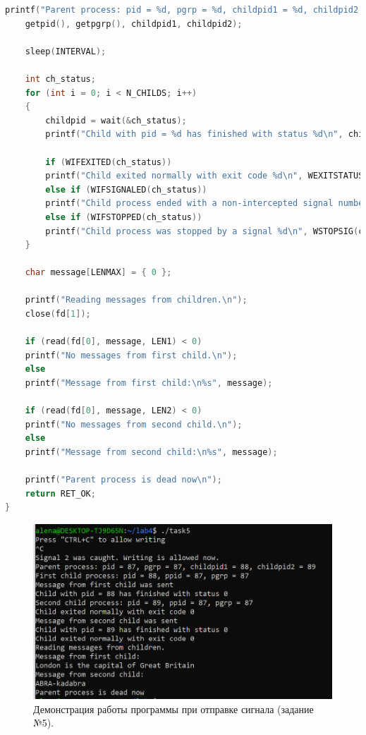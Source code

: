 \documentclass[12pt]{report}
\begin{document}
\begin{lstlisting}[label=some-code,caption=Код программы к заданию №5,language=C]
	printf("Parent process: pid = %d, pgrp = %d, childpid1 = %d, childpid2 = %d\n", 
	getpid(), getpgrp(), childpid1, childpid2);
	
	sleep(INTERVAL);
	
	int ch_status;
	for (int i = 0; i < N_CHILDS; i++)
	{
		childpid = wait(&ch_status);
		printf("Child with pid = %d has finished with status %d\n", childpid, ch_status);
		
		if (WIFEXITED(ch_status))
		printf("Child exited normally with exit code %d\n", WEXITSTATUS(ch_status));
		else if (WIFSIGNALED(ch_status))
		printf("Child process ended with a non-intercepted signal number %d\n", WTERMSIG(ch_status));
		else if (WIFSTOPPED(ch_status))
		printf("Child process was stopped by a signal %d\n", WSTOPSIG(ch_status));
	}
	
	char message[LENMAX] = { 0 };
	
	printf("Reading messages from children.\n");
	close(fd[1]);
	
	if (read(fd[0], message, LEN1) < 0)
	printf("No messages from first child.\n");
	else
	printf("Message from first child:\n%s", message);
	
	if (read(fd[0], message, LEN2) < 0)
	printf("No messages from second child.\n");
	else
	printf("Message from second child:\n%s", message);
	
	printf("Parent process is dead now\n");
	return RET_OK;
}
\end{lstlisting}

\begin{figure}[H]

	\centering

	\includegraphics[width=\linewidth]{img/task05_01.png}
	\caption{Демонстрация работы программы при отправке сигнала (задание №5).}

	\label{fig:task05_01}

\end{figure}
\end{document}
